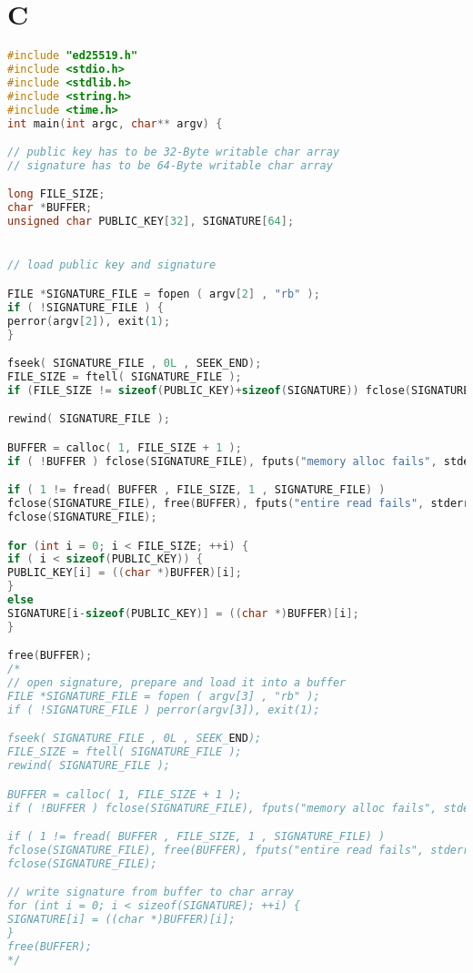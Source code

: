 \documentclass[thesis=bachelor,faculty=cb]{hsmw-thesis}
\begin{document}
\chapter{C}
\begin{lstlisting}[language=C]
#include "ed25519.h"
#include <stdio.h>
#include <stdlib.h>
#include <string.h>
#include <time.h>
int main(int argc, char** argv) {

// public key has to be 32-Byte writable char array
// signature has to be 64-Byte writable char array

long FILE_SIZE;
char *BUFFER;
unsigned char PUBLIC_KEY[32], SIGNATURE[64];


// load public key and signature

FILE *SIGNATURE_FILE = fopen ( argv[2] , "rb" );
if ( !SIGNATURE_FILE ) {
perror(argv[2]), exit(1);
}

fseek( SIGNATURE_FILE , 0L , SEEK_END);
FILE_SIZE = ftell( SIGNATURE_FILE );
if (FILE_SIZE != sizeof(PUBLIC_KEY)+sizeof(SIGNATURE)) fclose(SIGNATURE_FILE), fputs("incompatible signature type\n", stderr), exit(1); 

rewind( SIGNATURE_FILE );

BUFFER = calloc( 1, FILE_SIZE + 1 );
if ( !BUFFER ) fclose(SIGNATURE_FILE), fputs("memory alloc fails", stderr), exit(1);

if ( 1 != fread( BUFFER , FILE_SIZE, 1 , SIGNATURE_FILE) )
fclose(SIGNATURE_FILE), free(BUFFER), fputs("entire read fails", stderr), exit(1);
fclose(SIGNATURE_FILE);

for (int i = 0; i < FILE_SIZE; ++i) {
if ( i < sizeof(PUBLIC_KEY)) {
PUBLIC_KEY[i] = ((char *)BUFFER)[i];
}
else 
SIGNATURE[i-sizeof(PUBLIC_KEY)] = ((char *)BUFFER)[i];
}

free(BUFFER);
/*
// open signature, prepare and load it into a buffer
FILE *SIGNATURE_FILE = fopen ( argv[3] , "rb" );
if ( !SIGNATURE_FILE ) perror(argv[3]), exit(1);

fseek( SIGNATURE_FILE , 0L , SEEK_END);
FILE_SIZE = ftell( SIGNATURE_FILE );
rewind( SIGNATURE_FILE );

BUFFER = calloc( 1, FILE_SIZE + 1 );
if ( !BUFFER ) fclose(SIGNATURE_FILE), fputs("memory alloc fails", stderr), exit(1);

if ( 1 != fread( BUFFER , FILE_SIZE, 1 , SIGNATURE_FILE) )
fclose(SIGNATURE_FILE), free(BUFFER), fputs("entire read fails", stderr), exit(1);
fclose(SIGNATURE_FILE);

// write signature from buffer to char array
for (int i = 0; i < sizeof(SIGNATURE); ++i) {
SIGNATURE[i] = ((char *)BUFFER)[i];
}
free(BUFFER);
*/


\end{lstlisting}
\end{document}
